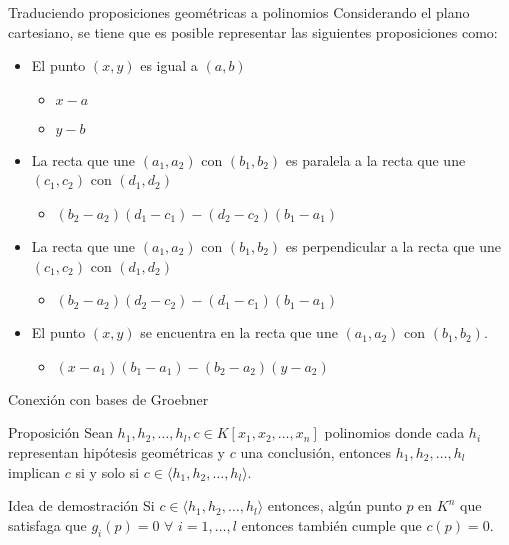 \documentclass[10pt]{beamer}
\newcommand{\gen}[1]{\ensuremath{\langle #1\rangle}}
\begin{document}
\begin{frame}{Traduciendo proposiciones geométricas a polinomios}
	Considerando el plano cartesiano, se tiene que es posible representar las siguientes proposiciones como:
	\begin{itemize}
		\item {El punto $(x,y)$ es igual a $(a,b)$}
			\begin{itemize}
				\item $x-a$
				\item $y-b$
			\end{itemize}
		\pause
		\item La recta que une $(a_1,a_2)$ con $(b_1,b_2)$ es paralela a la recta que une $(c_1,c_2)$ con $(d_1,d_2)$
			\begin{itemize}
				\item $(b_2-a_2)(d_1-c_1)-(d_2-c_2)(b_1-a_1)$
			\end{itemize}
		\pause
		\item La recta que une $(a_1,a_2)$ con $(b_1,b_2)$ es perpendicular a la recta que une $(c_1,c_2)$ con $(d_1,d_2)$
			\begin{itemize}
				\item $(b_2-a_2)(d_2-c_2)-(d_1-c_1)(b_1-a_1)$
			\end{itemize}
		\pause
		\item El punto $(x,y)$ se encuentra en la recta que une $(a_1,a_2)$ con $(b_1,b_2)$.
			\begin{itemize}
				\item $(x-a_1)(b_1-a_1)-(b_2-a_2)(y-a_2)$
			\end{itemize}
	\end{itemize}
\end{frame}
\begin{frame}{Conexión con bases de Groebner}
	\begin{block}{Proposición}
		Sean $h_1,h_2, \ldots,h_l,c \in K[x_1,x_2,\ldots,x_n]$ polinomios donde cada $h_i$ representan hipótesis geométricas y $c$ una conclusión, entonces $h_1,h_2, \ldots,h_l$ implican $c$ si y solo si $c \in \gen{h_1,h_2,\ldots,h_l}$.
	\end{block}
	\begin{block}{Idea de demostración}
		Si $c \in \gen{h_1,h_2,\ldots,h_l}$ entonces, algún punto $p$ en $K^n$ que satisfaga que $g_i(p)=0$ $\forall$ $i=1,\ldots,l$ entonces también cumple que $c(p)=0$.
	\end{block}
\end{frame}
\end{document}
